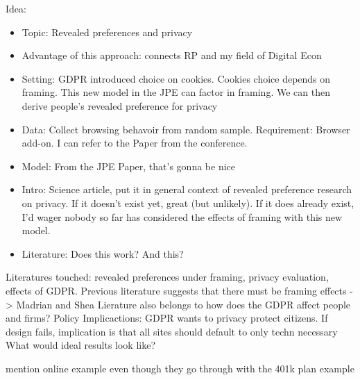 Idea: 
\begin{itemize}
    \item Topic: Revealed preferences and privacy
    \item Advantage of this approach: connects RP and my field of Digital Econ
    \item Setting: GDPR introduced choice on cookies. Cookies choice depends on framing. This new model in the JPE can factor in framing. We can then derive people's revealed preference for privacy
    \item Data: Collect browsing behavoir from random sample. Requirement: Browser add-on. I can refer to the Paper from the conference.
    \item Model: From the JPE Paper, that's gonna be nice
    \item Intro: Science article, put it in general  context of revealed preference research on privacy. If it doesn't exist yet, great (but unlikely). If it does already exist, I'd wager nobody so far has considered the effects of framing with this new model.
    \item Literature: Does this work? \parencite{acquisti2015privacy} And this? \parencite{levy2020}
\end{itemize}


Literatures touched: revealed preferences under framing, privacy evaluation, effects of GDPR.
Previous literature suggests that there must be framing effects -> Madrian and Shea
Lierature also belongs to how does the GDPR affect people and firms?
Policy Implicactions: GDPR wants to privacy protect citizens. If design fails, implication is 
that all sites should default to only techn necessary
What would ideal results look like?

\cite{acquisti2015privacy}  mention online example even though they go through with the 401k plan example